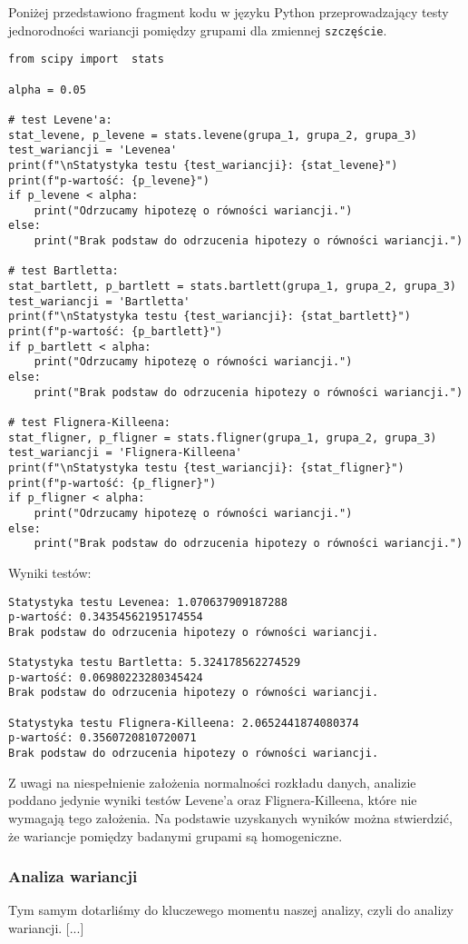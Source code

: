 \documentclass[12pt,a4paper]{article}
\begin{document}
\newpage
Poniżej przedstawiono fragment kodu w języku Python przeprowadzający testy jednorodności wariancji pomiędzy grupami dla zmiennej \texttt{szczęście}.
\begin{lstlisting}
from scipy import  stats

alpha = 0.05

# test Levene'a:
stat_levene, p_levene = stats.levene(grupa_1, grupa_2, grupa_3)
test_wariancji = 'Levenea'
print(f"\nStatystyka testu {test_wariancji}: {stat_levene}")
print(f"p-wartość: {p_levene}")
if p_levene < alpha:
    print("Odrzucamy hipotezę o równości wariancji.")
else:
    print("Brak podstaw do odrzucenia hipotezy o równości wariancji.")

# test Bartletta:
stat_bartlett, p_bartlett = stats.bartlett(grupa_1, grupa_2, grupa_3)
test_wariancji = 'Bartletta'
print(f"\nStatystyka testu {test_wariancji}: {stat_bartlett}")
print(f"p-wartość: {p_bartlett}")
if p_bartlett < alpha:
    print("Odrzucamy hipotezę o równości wariancji.")
else:
    print("Brak podstaw do odrzucenia hipotezy o równości wariancji.")

# test Flignera-Killeena:
stat_fligner, p_fligner = stats.fligner(grupa_1, grupa_2, grupa_3)
test_wariancji = 'Flignera-Killeena'
print(f"\nStatystyka testu {test_wariancji}: {stat_fligner}")
print(f"p-wartość: {p_fligner}")
if p_fligner < alpha:
    print("Odrzucamy hipotezę o równości wariancji.")
else:
    print("Brak podstaw do odrzucenia hipotezy o równości wariancji.")
\end{lstlisting}
Wyniki testów:
\begin{lstlisting}
Statystyka testu Levenea: 1.070637909187288
p-wartość: 0.34354562195174554
Brak podstaw do odrzucenia hipotezy o równości wariancji.

Statystyka testu Bartletta: 5.324178562274529
p-wartość: 0.06980223280345424
Brak podstaw do odrzucenia hipotezy o równości wariancji.

Statystyka testu Flignera-Killeena: 2.0652441874080374
p-wartość: 0.3560720810720071
Brak podstaw do odrzucenia hipotezy o równości wariancji.
\end{lstlisting}
Z uwagi na niespełnienie założenia normalności rozkładu danych, analizie poddano jedynie wyniki testów Levene’a oraz Flignera-Killeena, które nie wymagają tego założenia. Na podstawie uzyskanych wyników można stwierdzić, że wariancje pomiędzy badanymi grupami są homogeniczne.

\newpage
\subsubsection{Analiza wariancji}
Tym samym dotarliśmy do kluczewego momentu naszej analizy, czyli do analizy wariancji. [...]
\end{document}
